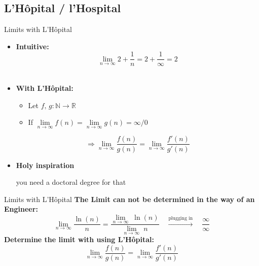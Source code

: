 \subsection{L'H\^{o}pital / l'Hospital}

\begin{frame}{Limits with L'H\^{o}pital}
  \begin{itemize}
    \item
      \textbf{Intuitive:}\\
      \begin{displaymath}
        \lim\limits_{n \rightarrow \infty} 2 + \dfrac{1}{n}
        = 2  + \dfrac{1}{\infty} = 2
      \end{displaymath}
      \vspace{0em}\\
    \item<2- |handout:1>
      \textbf{With L'H\^{o}pital:}
      \begin{itemize}
        \item
          Let $f, \, g : \mathbb{N} \rightarrow \mathbb{R}$
        \item
          If
          \begin{math}
            \lim\limits_{n \to \infty} f(n)
              = \lim\limits_{n \to \infty} g(n)
              = \infty / 0
          \end{math}
      \end{itemize}
      \begin{displaymath}
        \Rightarrow \lim\limits_{n \rightarrow \infty} \dfrac{f(n)}{g(n)}
          = \lim\limits_{n \rightarrow \infty} \dfrac{f'(n)}{g'(n)}
      \end{displaymath}
    \item<3- |handout:1>
      \textbf{Holy inspiration}
      \begin{center}
        you need a doctoral degree for that
      \end{center}
  \end{itemize}
\end{frame}


\begin{frame}{Limits with L'H\^{o}pital}
  \textbf{The Limit can not be determined in the way of an Engineer:}
  \begin{displaymath}
    \lim_{n \to \infty} \dfrac{\ln (n)}{n}
      = \dfrac{\lim_{n \to \infty}\; \ln (n)}{\lim\limits_{n \to \infty}\; n}
    \hspace{1em} \stackrel{\text{plugging in}}{\longrightarrow} \hspace{1em}
      \dfrac{\infty}{\infty}
  \end{displaymath}
  \textbf{Determine the limit with using L'H\^{o}pital:}
  \begin{displaymath}
    \lim\limits_{n \rightarrow \infty} \dfrac{f(n)}{g(n)}
      = \lim\limits_{n \rightarrow \infty} \dfrac{f'(n)}{g'(n)}
  \end{displaymath}
\end{frame}

